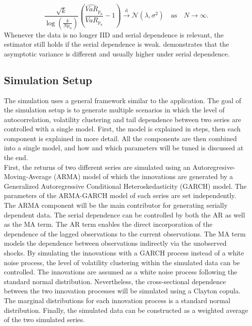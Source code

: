 \documentclass[a4paper,12pt]{article}
\theoremstyle{plain}
\begin{document}
\begin{equation}
    \frac{\sqrt{k}}{\log{\left(\frac{k}{Np_n}\right)}}\left(\frac{\widehat{VaR}_{p_n}}{VaR_{p_n}}-1\right)\xrightarrow{\text{d}}\mathcal{N}\left(\lambda, \sigma^2\right) \quad \text{as} \quad N\rightarrow\infty.
\end{equation}
Whenever the data is no longer IID and serial dependence is relevant, the estimator still holds if the serial dependence is weak.  demonstrates that the asymptotic variance is different and usually higher under serial dependence. 

\subsection{Simulation Setup}
The simulation uses a general framework similar to the application. The goal of the simulation setup is to generate multiple scenarios in which the level of autocorrelation, volatility clustering and tail dependence between two series are controlled with a single model. First, the model is explained in steps, then each component is explained in more detail. All the components are then combined into a single model, and how and which parameters will be tuned is discussed at the end.\\

First, the returns of two different series are simulated using an Autoregresive-Moving-Average (ARMA) model of which the innovations are generated by a Generalized Autoregressive Conditional Heteroskedasticity (GARCH) model. The parameters of the ARMA-GARCH model of each series are set independently. The ARMA component will be the main contributor for generating serially dependent data. The serial dependence can be controlled by both the AR as well as the MA term. The AR term enables the direct incorporation of the dependence of the lagged observations to the current observations. The MA term models the dependence between observations indirectly via the unobserved shocks. By simulating the innovations with a GARCH process instead of a white noise process, the level of volatility clustering within the simulated data can be controlled. The innovations are assumed as a white noise process following the standard normal distribution. Nevertheless, the cross-sectional dependence between the two innovation processes will be simulated using a Clayton copula. The marginal distributions for each innovation process is a standard normal distribution. Finally, the simulated data can be constructed as a weighted average of the two simulated series.\\
\end{document}
